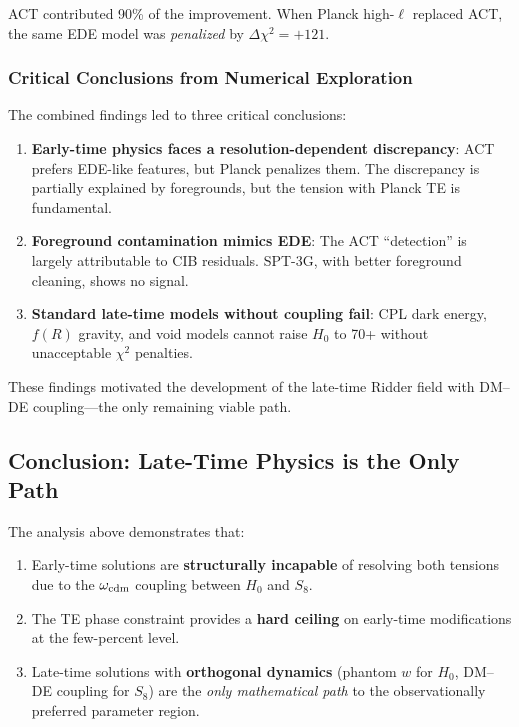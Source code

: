 \documentclass[twocolumn,showpacs,preprintnumbers,amsmath,amssymb,prd]{revtex4-2}
\begin{document}
ACT contributed 90\% of the improvement. When Planck high-$\ell$ replaced ACT, the same EDE model was \textit{penalized} by $\Delta\chi^2 = +121$.

\subsubsection{Critical Conclusions from Numerical Exploration}

The combined findings led to three critical conclusions:

\begin{enumerate}
    \item \textbf{Early-time physics faces a resolution-dependent discrepancy}: ACT prefers EDE-like features, but Planck penalizes them. The discrepancy is partially explained by foregrounds, but the tension with Planck TE is fundamental.
    
    \item \textbf{Foreground contamination mimics EDE}: The ACT ``detection'' is largely attributable to CIB residuals. SPT-3G, with better foreground cleaning, shows no signal.
    
    \item \textbf{Standard late-time models without coupling fail}: CPL dark energy, $f(R)$ gravity, and void models cannot raise $H_0$ to 70+ without unacceptable $\chi^2$ penalties.
\end{enumerate}

These findings motivated the development of the late-time Ridder field with DM--DE coupling---the only remaining viable path.

\subsection{Conclusion: Late-Time Physics is the Only Path}

The analysis above demonstrates that:
\begin{enumerate}
    \item Early-time solutions are \textbf{structurally incapable} of resolving both tensions due to the $\omega_{\rm cdm}$ coupling between $H_0$ and $S_8$.
    \item The TE phase constraint provides a \textbf{hard ceiling} on early-time modifications at the few-percent level.
    \item Late-time solutions with \textbf{orthogonal dynamics} (phantom $w$ for $H_0$, DM--DE coupling for $S_8$) are the \textit{only mathematical path} to the observationally preferred parameter region.
\end{enumerate}
\end{document}
